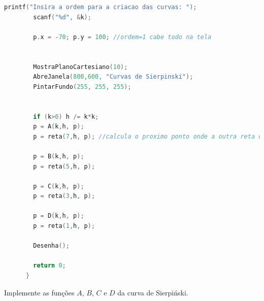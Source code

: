 \begin{enumerate}
\begin{lstlisting}[caption=Função main Curva de Sierpiński, label={func:mainsier}, language=C++]
        printf("Insira a ordem para a criacao das curvas: ");
        scanf("%d", &k);

        p.x = -70; p.y = 100; //ordem=1 cabe todo na tela


        MostraPlanoCartesiano(10);
        AbreJanela(800,600, "Curvas de Sierpinski");
        PintarFundo(255, 255, 255);


        if (k>0) h /= k*k;
        p = A(k,h, p); 
        p = reta(7,h, p); //calcula o proximo ponto onde a outra reta deve comecar

        p = B(k,h, p); 
        p = reta(5,h, p); 

        p = C(k,h, p); 
        p = reta(3,h, p);

        p = D(k,h, p); 
        p = reta(1,h, p);

        Desenha();

        return 0;
      }
      \end{lstlisting}

  Implemente as funções $A$, $B$, $C$ e $D$ da curva de Sierpiński.


\end{enumerate}

